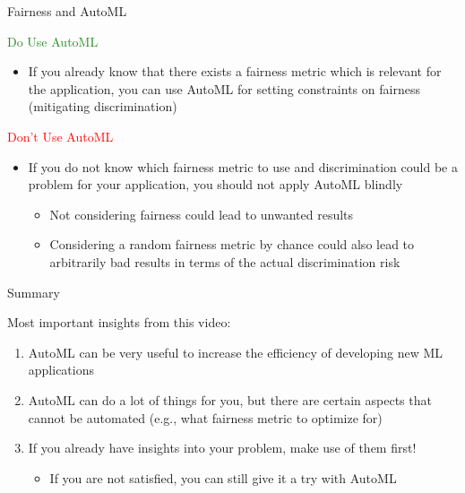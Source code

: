 \documentclass[main]{subfiles}
\begin{document}
\begin{frame}[c]{Fairness and AutoML  }

\textcolor{ForestGreen}{Do Use AutoML}
\begin{itemize}
    \item If you already know that there exists a fairness metric which is relevant for the application, you can use AutoML for setting constraints on fairness (mitigating discrimination)
\end{itemize}

\pause

\textcolor{Red}{Don't Use AutoML}

\begin{itemize}
    \item If you do not know which fairness metric to use and discrimination could be a problem for your application, you should not apply AutoML blindly 
    \begin{itemize}
        \item Not considering fairness could lead to unwanted results
        \item Considering a random fairness metric by chance could also lead to arbitrarily bad results in terms of the actual discrimination risk
    \end{itemize}
\end{itemize}

\end{frame}

\begin{frame}{Summary} 

Most important insights from this video:

\begin{enumerate}
    \item AutoML can be very useful to increase the efficiency of developing new ML applications
    \item AutoML can do a lot of things for you, but there are certain aspects that cannot be automated (e.g.,  what fairness metric to optimize for)
    \item If you already have insights into your problem, make use of them first! 
    \begin{itemize}
        \item If you are not satisfied, you can still give it a try with AutoML
    \end{itemize}
\end{enumerate}


\end{frame}
\end{document}
